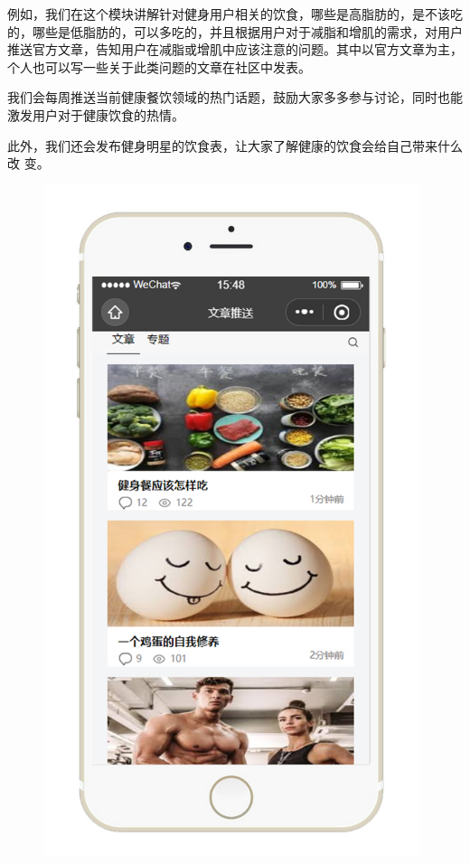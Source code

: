 \documentclass[UTF8,12pt]{ctexart}
\numberwithin{figure}{section}%
\begin{document}
\begin{spacing}{2}
\begin{itemize}
	例如，我们在这个模块讲解针对健身用户相关的饮食，哪些是高脂肪的，是不该吃的，哪些是低脂肪的，可以多吃的，并且根据用户对于减脂和增肌的需求，对用户推送官方文章，告知用户在减脂或增肌中应该注意的问题。其中以官方文章为主，个人也可以写一些关于此类问题的文章在社区中发表。
	
	我们会每周推送当前健康餐饮领域的热门话题，鼓励大家多多参与讨论，同时也能激发用户对于健康饮食的热情。
	
	此外，我们还会发布健身明星的饮食表，让大家了解健康的饮食会给自己带来什么改
	变。
	
	\newpage
	
	\begin{figure}[!htb]
		\centering
		\includegraphics[width=11cm]{fig/!17}
	\end{figure}
	
	\newpage
	

\end{itemize}
\end{spacing}
\end{document}
